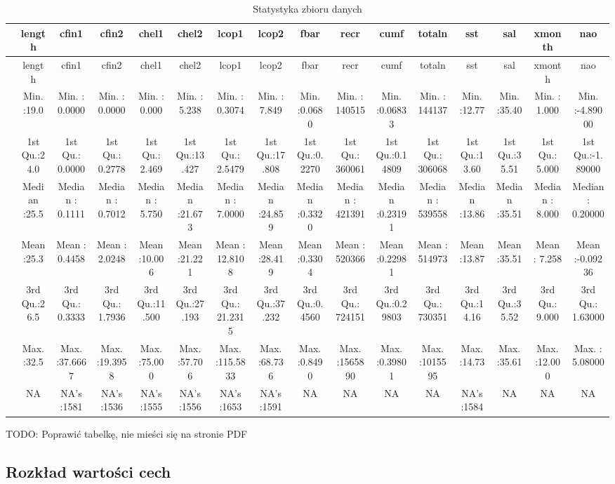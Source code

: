 \documentclass[]{article}
\begin{document}
\begin{longtable}[]{@{}lccccccccccccccc@{}}
\caption{Statystyka zbioru danych}\tabularnewline
\toprule
& length & cfin1 & cfin2 & chel1 & chel2 & lcop1 & lcop2 & fbar & recr &
cumf & totaln & sst & sal & xmonth & nao\tabularnewline
\midrule
\endfirsthead
\toprule
& length & cfin1 & cfin2 & chel1 & chel2 & lcop1 & lcop2 & fbar & recr &
cumf & totaln & sst & sal & xmonth & nao\tabularnewline
\midrule
\endhead
& Min. :19.0 & Min. : 0.0000 & Min. : 0.0000 & Min. : 0.000 & Min. :
5.238 & Min. : 0.3074 & Min. : 7.849 & Min. :0.0680 & Min. : 140515 &
Min. :0.06833 & Min. : 144137 & Min. :12.77 & Min. :35.40 & Min. : 1.000
& Min. :-4.89000\tabularnewline
& 1st Qu.:24.0 & 1st Qu.: 0.0000 & 1st Qu.: 0.2778 & 1st Qu.: 2.469 &
1st Qu.:13.427 & 1st Qu.: 2.5479 & 1st Qu.:17.808 & 1st Qu.:0.2270 & 1st
Qu.: 360061 & 1st Qu.:0.14809 & 1st Qu.: 306068 & 1st Qu.:13.60 & 1st
Qu.:35.51 & 1st Qu.: 5.000 & 1st Qu.:-1.89000\tabularnewline
& Median :25.5 & Median : 0.1111 & Median : 0.7012 & Median : 5.750 &
Median :21.673 & Median : 7.0000 & Median :24.859 & Median :0.3320 &
Median : 421391 & Median :0.23191 & Median : 539558 & Median :13.86 &
Median :35.51 & Median : 8.000 & Median : 0.20000\tabularnewline
& Mean :25.3 & Mean : 0.4458 & Mean : 2.0248 & Mean :10.006 & Mean
:21.221 & Mean : 12.8108 & Mean :28.419 & Mean :0.3304 & Mean : 520366 &
Mean :0.22981 & Mean : 514973 & Mean :13.87 & Mean :35.51 & Mean : 7.258
& Mean :-0.09236\tabularnewline
& 3rd Qu.:26.5 & 3rd Qu.: 0.3333 & 3rd Qu.: 1.7936 & 3rd Qu.:11.500 &
3rd Qu.:27.193 & 3rd Qu.: 21.2315 & 3rd Qu.:37.232 & 3rd Qu.:0.4560 &
3rd Qu.: 724151 & 3rd Qu.:0.29803 & 3rd Qu.: 730351 & 3rd Qu.:14.16 &
3rd Qu.:35.52 & 3rd Qu.: 9.000 & 3rd Qu.: 1.63000\tabularnewline
& Max. :32.5 & Max. :37.6667 & Max. :19.3958 & Max. :75.000 & Max.
:57.706 & Max. :115.5833 & Max. :68.736 & Max. :0.8490 & Max. :1565890 &
Max. :0.39801 & Max. :1015595 & Max. :14.73 & Max. :35.61 & Max. :12.000
& Max. : 5.08000\tabularnewline
& NA & NA's :1581 & NA's :1536 & NA's :1555 & NA's :1556 & NA's :1653 &
NA's :1591 & NA & NA & NA & NA & NA's :1584 & NA & NA &
NA\tabularnewline
\bottomrule
\end{longtable}

TODO: Poprawić tabelkę, nie mieści się na stronie PDF

\hypertarget{rozkux142ad-wartoux15bci-cech}{%
\subsection{Rozkład wartości cech}\label{rozkux142ad-wartoux15bci-cech}}
\end{document}
